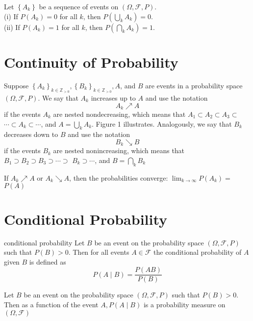 \documentclass[11pt]{elegantbook}
\begin{document}
\begin{corollary}
Let $\left\{A_k\right\}$ be a sequence of events on $(\Omega, \mathcal{F}, P)$.\\
\; (i) If $P\left(A_k\right)=0$ for all $k$, then $P\left(\bigcup_k A_k\right)=0$.\\
\; (ii) If $P\left(A_k\right)=1$ for all $k$, then $P\left(\bigcap_k A_k\right)=1$.
\end{corollary}

\section{Continuity of Probability}
\begin{definition}
    Suppose $\left\{A_k\right\}_{k \in \mathbb{Z}_{>0}},\left\{B_k\right\}_{k \in \mathbb{Z}_{>0}}, A$, and $B$ are events in a probability space
    $(\Omega, \mathcal{F}, P)$. We say that $A_k$ increases up to $A$ and use the notation
$$
A_k \nearrow A
$$
if the events $A_k$ are nested nondecreasing, which means that $A_1 \subset A_2 \subset A_3 \subset$ $\cdots \subset A_k \subset \cdots$, and $A=\bigcup_k A_k$. Figure 1 illustrates.
Analogously, we say that $B_k$ decreases down to $B$ and use the notation
$$
B_k \searrow B
$$
if the events $B_k$ are nested nonincreasing, which means that $B_1 \supset B_2 \supset B_3 \supset \cdots \supset$ $B_k \supset \cdots$, and $B=\bigcap_k B_k$
\end{definition}
\begin{theorem}

If $A_k \nearrow A$ or $A_k \searrow A$, then the probabilities converge: $\lim _{k \rightarrow \infty} P\left(A_k\right)=$ $P(A)$
\end{theorem}

\section{Conditional Probability}
\begin{definition}{conditional probability}
Let $B$ be an event on the probability space $(\Omega, \mathcal{F}, P)$ such that $P(B)>0$. Then for all events $A \in \mathcal{F}$ the conditional probability of $A$ given $B$ is defined as
$$
P(A \mid B)=\frac{P(A B)}{P(B)}
$$
\end{definition}

\begin{proposition}
  Let $B$ be an event on the probability space $(\Omega, \mathcal{F}, P)$ such that $P(B)>0$. Then as a function of the event $A, P(A \mid B)$ is a probability measure on $(\Omega, \mathcal{F})$
\end{proposition}
\end{document}
